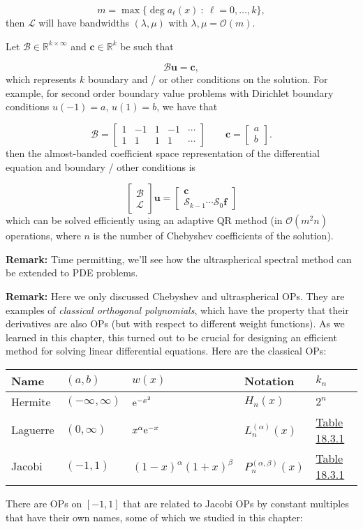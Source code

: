 \documentclass[12pt,a4paper]{article}
\begin{document}
\[
m = \max \{ \deg a_{\ell}(x) \: : \: \ell = 0, \ldots, k\},
\]
then $\mathcal{L}$ will have bandwidths $(\lambda, \mu)$ with $\lambda, \mu = \mathcal{O}(m)$. 

Let $\mathcal{B} \in \mathbb{R}^{k\times \infty}$ and $\mathbf{c} \in \mathbb{R}^{k}$ be such that 

\[
\mathcal{B}\mathbf{u} = \mathbf{c},
\]
which represents $k$ boundary and / or other conditions on the solution.  For example, for second order boundary value problems with Dirichlet boundary conditions $u(-1) = a$, $u(1)= b$, we have that 

\[
\mathcal{B} = 
\begin{bmatrix}
1 & -1 & 1 & -1 & \cdots  \\
1 &  1  & 1 & 1 & \cdots
\end{bmatrix} \qquad
\mathbf{c} = 
\begin{bmatrix} a \\
b 
\end{bmatrix}.
\]
then the almost-banded coefficient space representation of the differential equation and boundary / other conditions is

\[
\begin{bmatrix}
\mathcal{B} \\
\mathcal{L} 
\end{bmatrix}\mathbf{u} = 
\begin{bmatrix}
\mathbf{c} \\
\mathcal{S}_{k-1}\cdots\mathcal{S}_0\mathbf{f}
\end{bmatrix}
\]
which can be solved efficiently using an adaptive QR method (in $\mathcal{O}(m^2n)$ operations, where $n$ is the number of Chebyshev coefficients of the solution).  

\textbf{Remark:} Time permitting, we'll see how the ultraspherical spectral method can be extended to PDE problems.

\textbf{Remark:} Here we only discussed Chebyshev and ultraspherical OPs.  They are examples of \emph{classical orthogonal polynomials}, which have the property that their derivatives are also OPs (but with respect to different weight functions).  As we learned in this chapter, this turned out to be crucial for designing an efficient method for solving linear differential equations. Here are the classical OPs:

\begin{tabular}
{l | l | l | l | l}
Name & $(a,b)$ & $w(x)$ & Notation & $k_n$ \\
\hline
Hermite & $(-\infty,\infty)$ & ${\rm e}^{-x^2}$ & $H_n(x)$ & $2^n$ \\
Laguerre & $(0,\infty)$ & $x^\alpha {\rm e}^{-x}$ & $L_n^{(\alpha)}(x)$ & \href{http://dlmf.nist.gov/18.3}{Table 18.3.1} \\
Jacobi & $(-1,1)$ & $(1-x)^{\alpha} (1+x)^\beta$ & $P_n^{(\alpha,\beta)}(x)$ & \href{http://dlmf.nist.gov/18.3}{Table 18.3.1} \\
\end{tabular}
There are OPs on $[-1, 1]$ that are related to Jacobi OPs by constant multiples that have their own names, some of which we studied in this chapter:
\end{document}
